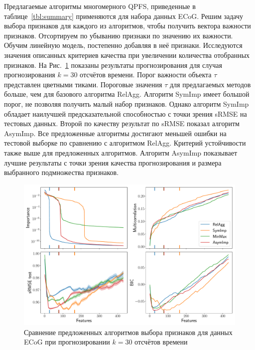 Предлагаемые алгоритмы многомерного QPFS, приведенные в таблице~\ref{tbl:summary} применяются для набора данных ECoG. 
Решим задачу выбора признаков для каждого из алгоритмов, чтобы получить вектора важности признаков. 
Отсортируем по убыванию признаки по значению их важности. Обучим линейную модель, постепенно добавляя в неё признаки. 
Исследуются значения описанных критериев качества при увеличении количества отобранных признаков. 
На Рис.~\ref{fig:ecog_3_30_metrics} показаны результаты прогнозирования для случая прогнозирования $k = 30$ отсчётов времени. 
Порог важности объекта $\tau$ представлен цветными тиками. 
Пороговые значения $\tau$ для предлагаемых методов больше, чем для базового алгоритма RelAgg. 
Алгоритм SymImp имеет большой порог, не позволяя получить малый набор признаков.
Однако алгоритм SymImp обладает наилучшей предсказательной способностью с точки зрения sRMSE на тестовых данных.
Второй по качеству результат по sRMSE показал алгоритм AsymImp.
Все предложенные алгоритмы достигают меньшей ошибки на тестовой выборке по сравнению с алгоритмом RelAgg. 
Критерий устойчивости также выше для предложенных алгоритмов.
Алгоритм AsymImp показывает лучшие результаты с точки зрения качества прогнозирования и размера выбранного подмножества признаков.

\begin{figure}[ht]
	\includegraphics[width=\linewidth]{figs/ch2/ecog_3_30_metrics}
	\caption{Сравнение предложенных алгоритмов выбора признаков для данных ECoG при прогнозировании $k = 30$ отсчётов времени}
	\label{fig:ecog_3_30_metrics}
\end{figure}

